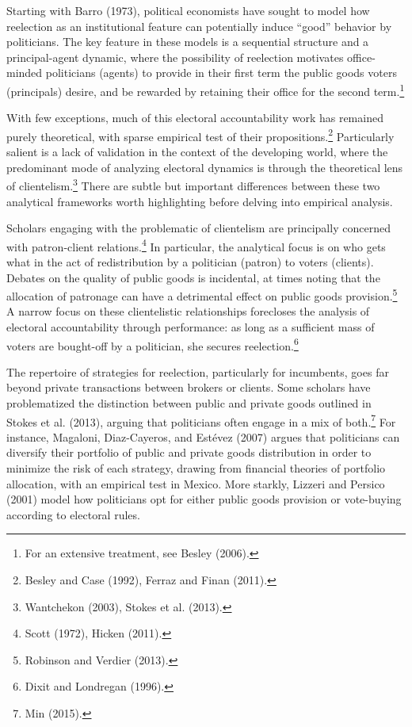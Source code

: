 \documentclass[12pt,]{article}
\let\rmarkdownfootnote\footnote%
\def\footnote{\protect\rmarkdownfootnote}
\begin{document}
Starting with Barro (1973), political economists have sought to model
how reelection as an institutional feature can potentially induce
``good'' behavior by politicians. The key feature in these models is a
sequential structure and a principal-agent dynamic, where the
possibility of reelection motivates office-minded politicians (agents)
to provide in their first term the public goods voters (principals)
desire, and be rewarded by retaining their office for the second
term.\footnote{For an extensive treatment, see Besley (2006).}

With few exceptions, much of this electoral accountability work has
remained purely theoretical, with sparse empirical test of their
propositions.\footnote{Besley and Case (1992), Ferraz and Finan (2011).}
Particularly salient is a lack of validation in the context of the
developing world, where the predominant mode of analyzing electoral
dynamics is through the theoretical lens of clientelism.\footnote{Wantchekon
  (2003), Stokes et al. (2013).} There are subtle but important
differences between these two analytical frameworks worth highlighting
before delving into empirical analysis.

Scholars engaging with the problematic of clientelism are principally
concerned with patron-client relations.\footnote{Scott (1972), Hicken
  (2011).} In particular, the analytical focus is on who gets what in
the act of redistribution by a politician (patron) to voters (clients).
Debates on the quality of public goods is incidental, at times noting
that the allocation of patronage can have a detrimental effect on public
goods provision.\footnote{Robinson and Verdier (2013).} A narrow focus
on these clientelistic relationships forecloses the analysis of
electoral accountability through performance: as long as a sufficient
mass of voters are bought-off by a politician, she secures
reelection.\footnote{Dixit and Londregan (1996).}

The repertoire of strategies for reelection, particularly for
incumbents, goes far beyond private transactions between brokers or
clients. Some scholars have problematized the distinction between public
and private goods outlined in Stokes et al. (2013), arguing that
politicians often engage in a mix of both.\footnote{Min (2015).} For
instance, Magaloni, Diaz-Cayeros, and Estévez (2007) argues that
politicians can diversify their portfolio of public and private goods
distribution in order to minimize the risk of each strategy, drawing
from financial theories of portfolio allocation, with an empirical test
in Mexico. More starkly, Lizzeri and Persico (2001) model how
politicians opt for either public goods provision or vote-buying
according to electoral rules.
\end{document}

